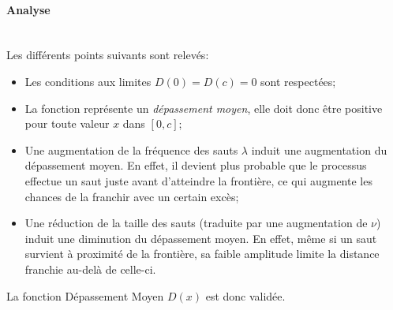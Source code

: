 \FloatBarrier\paragraph{Analyse}\phantom{}\\
Les différents points suivants sont relevés:
\begin{itemize}
    \item Les conditions aux limites $D(0)=D(c)=0$ sont respectées;
    \item La fonction représente un \textit{dépassement moyen}, elle doit donc être positive pour toute valeur $x$ dans $[0,c]$;
    \item Une augmentation de la fréquence des sauts $\lambda$ induit une augmentation du dépassement moyen. En effet, il devient plus probable que le processus effectue un saut juste avant d'atteindre la frontière, ce qui augmente les chances de la franchir avec un certain excès;
    \item Une réduction de la taille des sauts (traduite par une augmentation de $\nu$) induit une diminution du dépassement moyen. En effet, même si un saut survient à proximité de la frontière, sa faible amplitude limite la distance franchie au-delà de celle-ci.
\end{itemize}
La fonction Dépassement Moyen $D(x)$ est donc validée.

